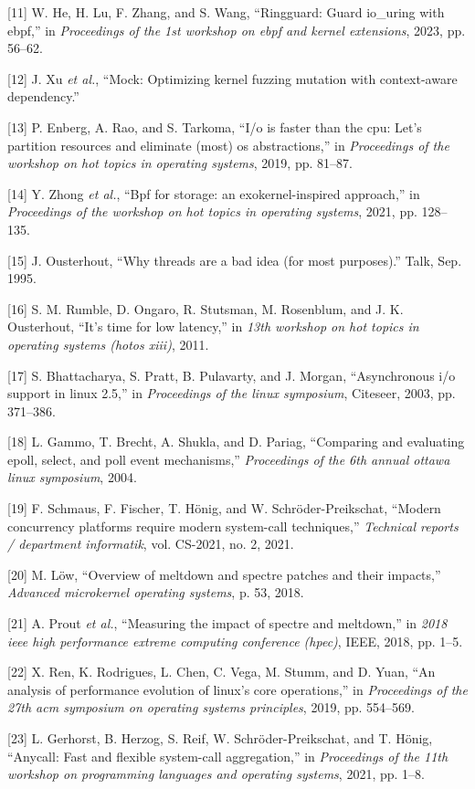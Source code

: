 \documentclass[letterpaper, 10pt, twocolumn]{article}
\begin{document}
\begin{hangparas}{1.5em}{1}
\hypertarget{citeproc_bib_item_11}{[11] W. He, H. Lu, F. Zhang, and S. Wang, “Ringguard: Guard io\_uring with ebpf,” in \textit{Proceedings of the 1st workshop on ebpf and kernel extensions}, 2023, pp. 56–62.}

\hypertarget{citeproc_bib_item_12}{[12] J. Xu \textit{et al.}, “Mock: Optimizing kernel fuzzing mutation with context-aware dependency.”}

\hypertarget{citeproc_bib_item_13}{[13] P. Enberg, A. Rao, and S. Tarkoma, “I/o is faster than the cpu: Let’s partition resources and eliminate (most) os abstractions,” in \textit{Proceedings of the workshop on hot topics in operating systems}, 2019, pp. 81–87.}

\hypertarget{citeproc_bib_item_14}{[14] Y. Zhong \textit{et al.}, “Bpf for storage: an exokernel-inspired approach,” in \textit{Proceedings of the workshop on hot topics in operating systems}, 2021, pp. 128–135.}

\hypertarget{citeproc_bib_item_15}{[15] J. Ousterhout, “Why threads are a bad idea (for most purposes).” Talk, Sep. 1995.}

\hypertarget{citeproc_bib_item_16}{[16] S. M. Rumble, D. Ongaro, R. Stutsman, M. Rosenblum, and J. K. Ousterhout, “It’s time for low latency,” in \textit{13th workshop on hot topics in operating systems (hotos xiii)}, 2011.}

\hypertarget{citeproc_bib_item_17}{[17] S. Bhattacharya, S. Pratt, B. Pulavarty, and J. Morgan, “Asynchronous i/o support in linux 2.5,” in \textit{Proceedings of the linux symposium}, Citeseer, 2003, pp. 371–386.}

\hypertarget{citeproc_bib_item_18}{[18] L. Gammo, T. Brecht, A. Shukla, and D. Pariag, “Comparing and evaluating epoll, select, and poll event mechanisms,” \textit{Proceedings of the 6th annual ottawa linux symposium}, 2004.}

\hypertarget{citeproc_bib_item_19}{[19] F. Schmaus, F. Fischer, T. Hönig, and W. Schröder-Preikschat, “Modern concurrency platforms require modern system-call techniques,” \textit{Technical reports / department informatik}, vol. CS-2021, no. 2, 2021.}

\hypertarget{citeproc_bib_item_20}{[20] M. Löw, “Overview of meltdown and spectre patches and their impacts,” \textit{Advanced microkernel operating systems}, p. 53, 2018.}

\hypertarget{citeproc_bib_item_21}{[21] A. Prout \textit{et al.}, “Measuring the impact of spectre and meltdown,” in \textit{2018 ieee high performance extreme computing conference (hpec)}, IEEE, 2018, pp. 1–5.}

\hypertarget{citeproc_bib_item_22}{[22] X. Ren, K. Rodrigues, L. Chen, C. Vega, M. Stumm, and D. Yuan, “An analysis of performance evolution of linux’s core operations,” in \textit{Proceedings of the 27th acm symposium on operating systems principles}, 2019, pp. 554–569.}

\hypertarget{citeproc_bib_item_23}{[23] L. Gerhorst, B. Herzog, S. Reif, W. Schröder-Preikschat, and T. Hönig, “Anycall: Fast and flexible system-call aggregation,” in \textit{Proceedings of the 11th workshop on programming languages and operating systems}, 2021, pp. 1–8.}\bigskip
\end{hangparas}
\end{document}
